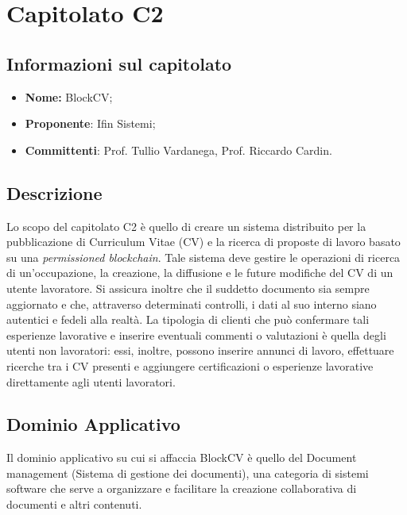 \section{Capitolato C2}
\subsection{Informazioni sul capitolato}
  \begin{itemize}
    \item \textbf{Nome:}
    BlockCV;
    \item \textbf{Proponente}:
    Ifin Sistemi;
    \item \textbf{Committenti}:
    Prof. Tullio Vardanega, Prof. Riccardo Cardin.
  \end{itemize}

\subsection{Descrizione}
  Lo scopo del capitolato C2 è quello di creare un sistema distribuito per la pubblicazione di Curriculum Vitae (CV) e la ricerca di proposte di lavoro basato su una \textit{permissioned blockchain}. Tale sistema deve gestire le operazioni di ricerca di un'occupazione, la creazione, la diffusione e le future modifiche del CV di un utente lavoratore. Si assicura inoltre che il suddetto documento sia sempre aggiornato e che, attraverso determinati controlli, i dati al suo interno siano autentici e fedeli alla realtà.
  \newline \newline La tipologia di clienti che può confermare tali esperienze lavorative e inserire eventuali commenti o valutazioni è quella degli utenti non lavoratori: essi, inoltre, possono inserire annunci di lavoro, effettuare ricerche tra i CV presenti e aggiungere certificazioni o esperienze lavorative direttamente agli utenti lavoratori.

\subsection{Dominio Applicativo}
  Il dominio applicativo su cui si affaccia BlockCV è quello del Document management (Sistema di gestione dei documenti), una categoria di sistemi software che serve a organizzare e facilitare la creazione collaborativa di documenti e altri contenuti.


